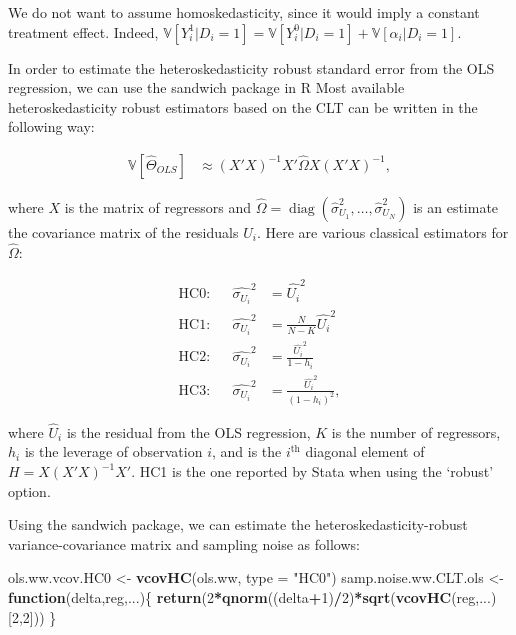 \documentclass[]{book}
\newenvironment{Shaded}{\begin{snugshade}}{\end{snugshade}}
\newcommand{\ControlFlowTok}[1]{\textcolor[rgb]{0.13,0.29,0.53}{\textbf{#1}}}
\newcommand{\DataTypeTok}[1]{\textcolor[rgb]{0.13,0.29,0.53}{#1}}
\newcommand{\DecValTok}[1]{\textcolor[rgb]{0.00,0.00,0.81}{#1}}
\newcommand{\KeywordTok}[1]{\textcolor[rgb]{0.13,0.29,0.53}{\textbf{#1}}}
\newcommand{\NormalTok}[1]{#1}
\newcommand{\OperatorTok}[1]{\textcolor[rgb]{0.81,0.36,0.00}{\textbf{#1}}}
\newcommand{\StringTok}[1]{\textcolor[rgb]{0.31,0.60,0.02}{#1}}
\newcommand{\var}[1]{\mathbb{V}[ #1 ]}
\DeclareMathOperator{\diag}{diag}
\theoremstyle{definition}
\theoremstyle{definition}
\theoremstyle{definition}
\theoremstyle{remark}
\let\BeginKnitrBlock\begin \let\EndKnitrBlock\end
\begin{document}
We do not want to assume homoskedasticity, since it would imply a constant treatment effect.
Indeed, \(\var{Y_i^1|D_i=1} = \var{Y_i^0|D_i=1}+\var{\alpha_i|D_i=1}\).

\BeginKnitrBlock{remark}
\iffalse{} {Remark. } \fi{}In order to estimate the heteroskedasticity robust standard error from the OLS regression, we can use the sandwich package in R
Most available heteroskedasticity robust estimators based on the CLT can be written in the following way:
\EndKnitrBlock{remark}

\begin{align*}
  \var{\hat{\Theta}_{OLS}} & \approx (X'X)^{-1}X'\hat{\Omega}X(X'X)^{-1},
\end{align*}

where \(X\) is the matrix of regressors and \(\hat{\Omega}=\diag(\hat{\sigma}^2_{U_1},\dots,\hat{\sigma}^2_{U_N})\) is an estimate the covariance matrix of the residuals \(U_i\).
Here are various classical estimators for \(\hat{\Omega}\):

\begin{align*}
  \text{HC0:} & & \hat{\sigma_{U_i}}^2 & = \hat{U_i}^2 \\
  \text{HC1:} & & \hat{\sigma_{U_i}}^2 & = \frac{N}{N-K}\hat{U_i}^2 \\
  \text{HC2:} & & \hat{\sigma_{U_i}}^2 & = \frac{\hat{U_i}^2}{1-h_i} \\
  \text{HC3:} & & \hat{\sigma_{U_i}}^2 & = \frac{\hat{U_i}^2}{(1-h_i)^2}, 
\end{align*}

where \(\hat{U}_i\) is the residual from the OLS regression, \(K\) is the number of regressors, \(h_i\) is the leverage of observation \(i\), and is the \(i^{\text{th}}\) diagonal element of \(H=X(X'X)^{-1}X'\).
HC1 is the one reported by Stata when using the `robust' option.

\BeginKnitrBlock{example}
\protect\hypertarget{exm:unnamed-chunk-54}{}{\label{exm:unnamed-chunk-54} }Using the sandwich package, we can estimate the heteroskedasticity-robust variance-covariance matrix and sampling noise as follows:
\EndKnitrBlock{example}

\begin{Shaded}
\begin{Highlighting}[]
\NormalTok{ols.ww.vcov.HC0 <-}\StringTok{ }\KeywordTok{vcovHC}\NormalTok{(ols.ww, }\DataTypeTok{type =} \StringTok{"HC0"}\NormalTok{)}
\NormalTok{samp.noise.ww.CLT.ols <-}\StringTok{ }\ControlFlowTok{function}\NormalTok{(delta,reg,...)\{}
  \KeywordTok{return}\NormalTok{(}\DecValTok{2}\OperatorTok{*}\KeywordTok{qnorm}\NormalTok{((delta}\OperatorTok{+}\DecValTok{1}\NormalTok{)}\OperatorTok{/}\DecValTok{2}\NormalTok{)}\OperatorTok{*}\KeywordTok{sqrt}\NormalTok{(}\KeywordTok{vcovHC}\NormalTok{(reg,...)[}\DecValTok{2}\NormalTok{,}\DecValTok{2}\NormalTok{]))}
\NormalTok{\}}
\end{Highlighting}
\end{Shaded}
\end{document}
